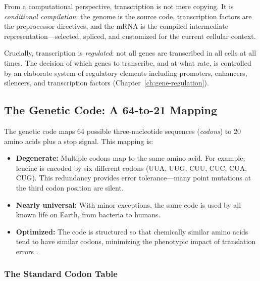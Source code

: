 \begin{keyinsight}
From a computational perspective, transcription is not mere copying. It is \emph{conditional compilation}: the genome is the source code, transcription factors are the preprocessor directives, and the mRNA is the compiled intermediate representation---selected, spliced, and customized for the current cellular context.
\end{keyinsight}

Crucially, transcription is \emph{regulated}: not all genes are transcribed in all cells at all times. The decision of which genes to transcribe, and at what rate, is controlled by an elaborate system of regulatory elements including promoters, enhancers, silencers, and transcription factors (Chapter~\ref{ch:gene-regulation}).

\subsection{The Genetic Code: A 64-to-21 Mapping}
\label{subsec:genetic-code}

The genetic code maps 64 possible three-nucleotide sequences (\emph{codons}) to 20 amino acids plus a stop signal. This mapping is:

\begin{itemize}[leftmargin=1.8em]
  \item \textbf{Degenerate:} Multiple codons map to the same amino acid. For example, leucine is encoded by six different codons (UUA, UUG, CUU, CUC, CUA, CUG). This redundancy provides error tolerance---many point mutations at the third codon position are silent.

  \item \textbf{Nearly universal:} With minor exceptions, the same code is used by all known life on Earth, from bacteria to humans.

  \item \textbf{Optimized:} The code is structured so that chemically similar amino acids tend to have similar codons, minimizing the phenotypic impact of translation errors \citep{alberts2022}.
\end{itemize}

\subsubsection{The Standard Codon Table}

